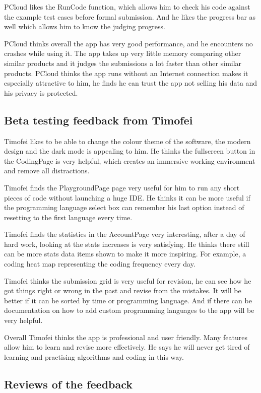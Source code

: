 \documentclass[report.tex]{subfiles}
\begin{document}
PCloud likes the RunCode function, which allows him to check his code against the example test cases before formal submission. And he likes the progress bar as well which allows him to know the judging progress.

PCloud thinks overall the app has very good performance, and he encounters no crashes while using it. The app takes up very little memory comparing other similar products and it judges the submissions a lot faster than other similar products. PCloud thinks the app runs without an Internet connection makes it especially attractive to him, he finds he can trust the app not selling his data and his privacy is protected.

\subsection{Beta testing feedback from Timofei}

Timofei likes to be able to change the colour theme of the software, the modern design and the dark mode is appealing to him. He thinks the fullscreen button in the CodingPage is very helpful, which creates an immersive working environment and remove all distractions.

Timofei finds the PlaygroundPage page very useful for him to run any short pieces of code without launching a huge IDE. He thinks it can be more useful if the programming language select box can remember his last option instead of resetting to the first language every time.

Timofei finds the statistics in the AccountPage very interesting, after a day of hard work, looking at the stats increases is very satisfying. He thinks there still can be more stats data items shown to make it more inspiring. For example, a coding heat map representing the coding frequency every day.

Timofei thinks the submission grid is very useful for revision, he can see how he got things right or wrong in the past and revise from the mistakes. It will be better if it can be sorted by time or programming language. And if there can be documentation on how to add custom programming languages to the app will be very helpful.

Overall Timofei thinks the app is professional and user friendly. Many features allow him to learn and revise more effectively. He says he will never get tired of learning and practising algorithms and coding in this way.

\subsection{Reviews of the feedback}
\end{document}
